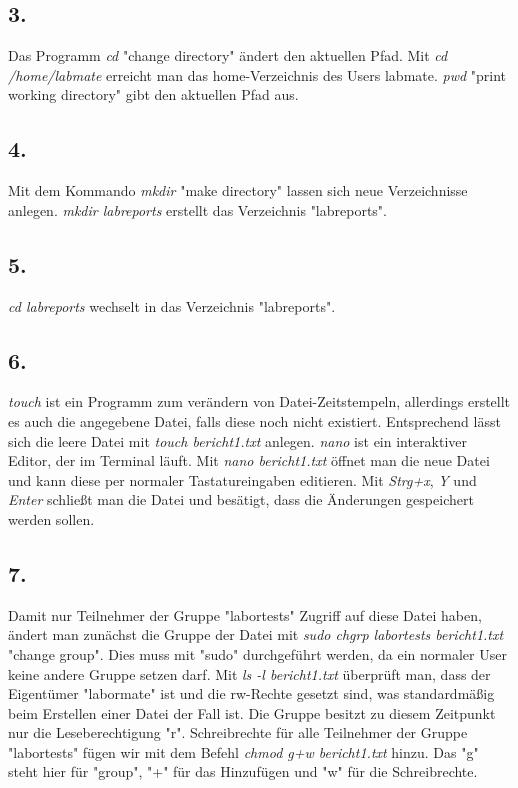 \documentclass[
    fontsize=12pt,
    headings=small,
    parskip=half,           %
    bibliography=totoc,
    numbers=noenddot,       %
    open=any,               %
    ]{scrreprt}
\begin{document}
\subsection*{3.}
Das Programm \emph{cd} "change directory" ändert den aktuellen Pfad. Mit \emph{cd /home/labmate} erreicht man das home-Verzeichnis des Users labmate.
\emph{pwd} "print working directory" gibt den aktuellen Pfad aus.

\subsection*{4.}
Mit dem Kommando \emph{mkdir} "make directory" lassen sich neue Verzeichnisse anlegen. \emph{mkdir labreports} erstellt das Verzeichnis "labreports".

\subsection*{5.}
\emph{cd labreports} wechselt in das Verzeichnis "labreports".

\subsection*{6.}
\emph{touch} ist ein Programm zum verändern von Datei-Zeitstempeln, allerdings erstellt es auch die angegebene Datei, falls diese noch nicht existiert. Entsprechend lässt sich die leere Datei mit \emph{touch bericht1.txt} anlegen.
\emph{nano} ist ein interaktiver Editor, der im Terminal läuft. Mit \emph{nano bericht1.txt} öffnet man die neue Datei und kann diese per normaler Tastatureingaben editieren. Mit \emph{Strg+x}, \emph{Y} und \emph{Enter} schließt man die Datei und besätigt, dass die Änderungen gespeichert werden sollen.

\subsection*{7.}
Damit nur Teilnehmer der Gruppe "labortests" Zugriff auf diese Datei haben, ändert man zunächst die Gruppe der Datei mit \emph{sudo chgrp labortests bericht1.txt} "change group". Dies muss mit "sudo" durchgeführt werden, da ein normaler User keine andere Gruppe setzen darf.
Mit \emph{ls -l bericht1.txt} überprüft man, dass der Eigentümer "labormate" ist und die rw-Rechte gesetzt sind, was standardmäßig beim Erstellen einer Datei der Fall ist. Die Gruppe besitzt zu diesem Zeitpunkt nur die Leseberechtigung "r". Schreibrechte für alle Teilnehmer der Gruppe "labortests" fügen wir mit dem Befehl \emph{chmod g+w bericht1.txt} hinzu. Das "g" steht hier für "group", "+" für das Hinzufügen und "w" für die Schreibrechte.
\end{document}
